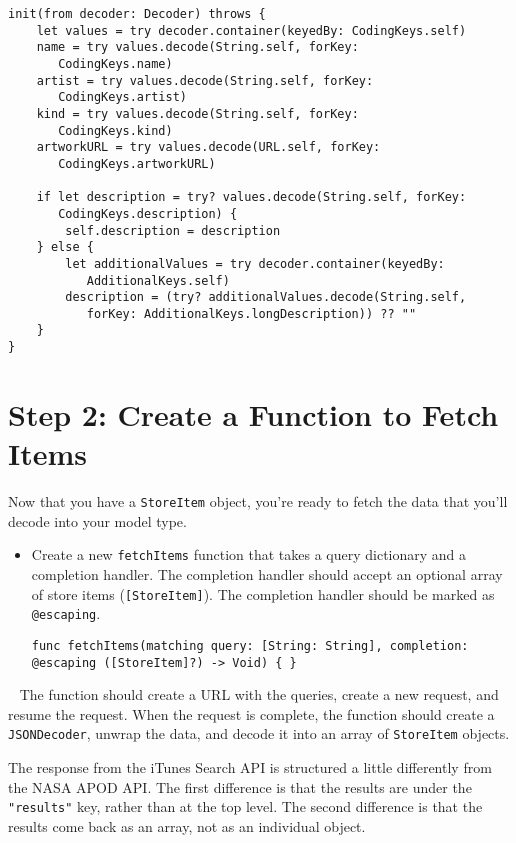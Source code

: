 \documentclass[a4paper,11pt]{scrartcl}
\begin{document}
\begin{itemize}
\begin{lstlisting}
init(from decoder: Decoder) throws {
    let values = try decoder.container(keyedBy: CodingKeys.self)
    name = try values.decode(String.self, forKey:
       CodingKeys.name)
    artist = try values.decode(String.self, forKey:
       CodingKeys.artist)
    kind = try values.decode(String.self, forKey:
       CodingKeys.kind)
    artworkURL = try values.decode(URL.self, forKey:
       CodingKeys.artworkURL)

    if let description = try? values.decode(String.self, forKey:
       CodingKeys.description) {
        self.description = description
    } else {
        let additionalValues = try decoder.container(keyedBy:
           AdditionalKeys.self)
        description = (try? additionalValues.decode(String.self,
           forKey: AdditionalKeys.longDescription)) ?? ""
    }
}
\end{lstlisting}
\end{itemize}

\section*{Step 2: Create a Function to Fetch Items}
Now that you have a \texttt{StoreItem} object, you're ready to fetch the data that you'll decode into your model type.

\begin{itemize}
\item Create a new \texttt{fetchItems} function that takes a query dictionary and a completion handler. The completion handler should accept an optional array of store items (\texttt{[StoreItem]}). The completion handler should be marked as \texttt{@escaping}.
\begin{lstlisting}
func fetchItems(matching query: [String: String], completion:
@escaping ([StoreItem]?) -> Void) { }
\end{lstlisting}
\end{itemize}
 
The function should create a URL with the queries, create a new request, and resume the request. When the request is complete, the function should create a \texttt{JSONDecoder}, unwrap the data, and decode it into an array of \texttt{StoreItem} objects.

The response from the iTunes Search API is structured a little differently from the NASA APOD API. The first difference is that the results are under the \texttt{"results"} key, rather than at the top level. The second difference is that the results come back as an array, not as an individual object.
\end{document}
